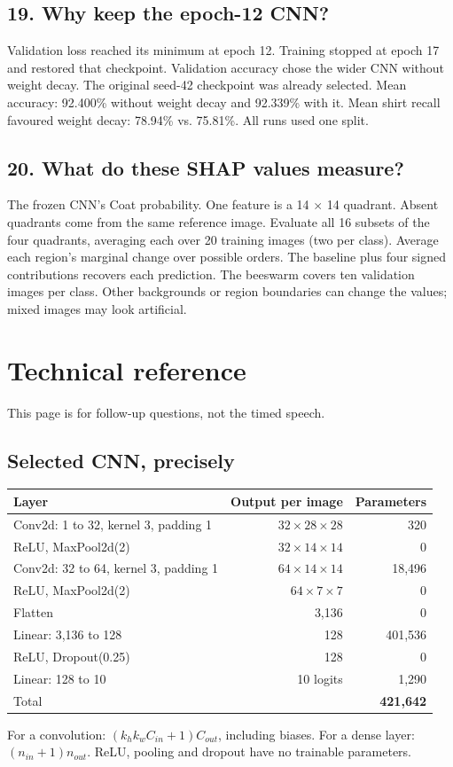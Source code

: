 \documentclass[11pt,a4paper]{article}
\newcounter{question}
\begin{document}
\subsection{19. Why keep the epoch-12 CNN?}
Validation loss reached its minimum at epoch 12. Training stopped at epoch 17 and restored that checkpoint. Validation accuracy chose the wider CNN without weight decay. The original seed-42 checkpoint was already selected. Mean accuracy: 92.400\% without weight decay and 92.339\% with it. Mean shirt recall favoured weight decay: 78.94\% vs. 75.81\%. All runs used one split.
\subsection{20. What do these SHAP values measure?}
The frozen CNN's Coat probability. One feature is a 14 $\times$ 14 quadrant. Absent quadrants come from the same reference image. Evaluate all 16 subsets of the four quadrants, averaging each over 20 training images (two per class). Average each region's marginal change over possible orders. The baseline plus four signed contributions recovers each prediction. The beeswarm covers ten validation images per class. Other backgrounds or region boundaries can change the values; mixed images may look artificial.

\clearpage\section{Technical reference}
This page is for follow-up questions, not the timed speech.
\subsection{Selected CNN, precisely}
\begin{tabularx}{\linewidth}{Xrr}
\toprule Layer & Output per image & Parameters\\\midrule
Conv2d: 1 to 32, kernel 3, padding 1 & $32\times28\times28$ & 320\\
ReLU, MaxPool2d(2) & $32\times14\times14$ & 0\\
Conv2d: 32 to 64, kernel 3, padding 1 & $64\times14\times14$ & 18,496\\
ReLU, MaxPool2d(2) & $64\times7\times7$ & 0\\
Flatten & 3,136 & 0\\
Linear: 3,136 to 128 & 128 & 401,536\\
ReLU, Dropout(0.25) & 128 & 0\\
Linear: 128 to 10 & 10 logits & 1,290\\\midrule
Total & & \textbf{421,642}\\\bottomrule
\end{tabularx}
For a convolution: $(k_hk_wC_{in}+1)C_{out}$, including biases. For a dense layer: $(n_{in}+1)n_{out}$. ReLU, pooling and dropout have no trainable parameters.
\end{document}
